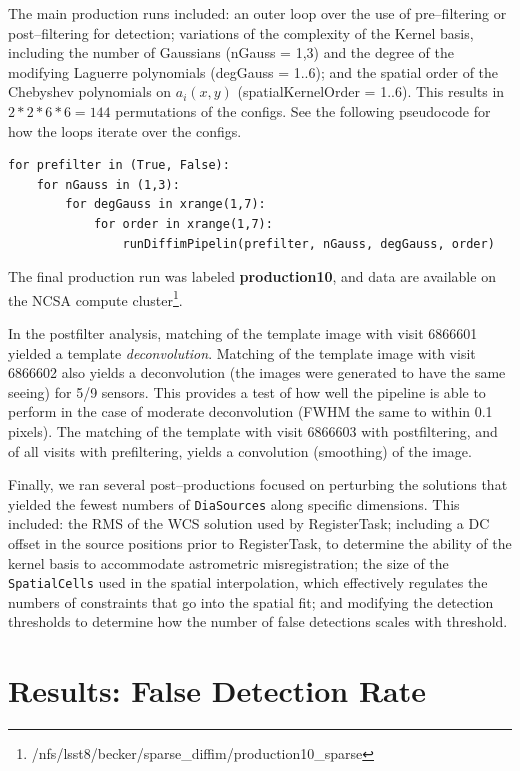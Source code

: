 \documentclass[prd, nofootinbib, floatfix, 11pt,tightenlines,times]{article}
\begin{document}
The main production runs included: an outer loop over the use of
pre--filtering or post--filtering for detection; variations of the
complexity of the Kernel basis, including the number of Gaussians
(nGauss = 1,3) and the degree of the modifying Laguerre polynomials
(degGauss = 1..6); and the spatial order of the Chebyshev polynomials
on $a_i(x,y)$ (spatialKernelOrder = 1..6).  This results in $2*2*6*6=144$ permutations
of the configs.  See the following pseudocode
for how the loops iterate over the configs.

\clearpage
\begin{verbatim}
for prefilter in (True, False):
    for nGauss in (1,3):
        for degGauss in xrange(1,7):
            for order in xrange(1,7):
                runDiffimPipelin(prefilter, nGauss, degGauss, order)
\end{verbatim}

The final production run
was labeled {\bf production10}, and data are available on the NCSA compute
cluster\footnote{/nfs/lsst8/becker/sparse\_diffim/production10\_sparse}.

In the postfilter analysis, matching of the template image
with visit 6866601 yielded a template {\it deconvolution}.  Matching of the template 
image with visit 6866602 also yields a deconvolution (the images were generated to
have the same seeing) for 5/9 sensors.  This provides a test
of how well the pipeline is able to perform in the case of moderate deconvolution 
(FWHM the same to within 0.1 pixels).  The matching of the template
with visit 6866603 with postfiltering, and of all visits with
prefiltering, yields a convolution (smoothing) of the image. 

Finally, we ran several post--productions focused on perturbing the
solutions that yielded the fewest numbers of {\tt DiaSources} along specific
dimensions.  This included: the RMS of the WCS solution used by
RegisterTask; including a DC offset in the source positions prior to
RegisterTask, to determine the ability of the kernel basis to
accommodate astrometric misregistration; the size of the {\tt
  SpatialCells} used in the spatial interpolation, which effectively
regulates the numbers of constraints that go into the spatial fit; and
modifying the detection thresholds to determine how the number of
false detections scales with threshold.


\section{Results: False Detection Rate}
\end{document}

